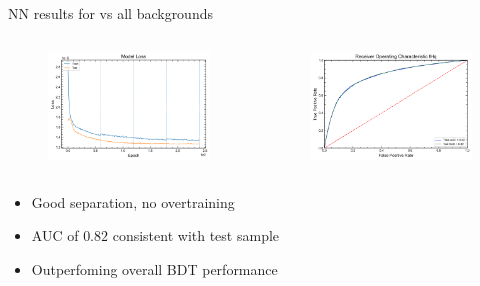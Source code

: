 \begin{frame}{NN results for \tHq vs all backgrounds}
\begin{columns}
  \begin{column}{0.5\textwidth}
    \begin{figure}
      \includegraphics[width=\textwidth]{loss_lephad.png}
    \end{figure}
  \end{column}
  \begin{column}{0.5\textwidth}
    \begin{figure}
      \includegraphics[width=\textwidth]{ROC_lephad.png}
    \end{figure}
  \end{column}
\end{columns}
\begin{itemize}
  \item Good separation, no overtraining
  \item AUC of $0.82$ consistent with test sample
  \item Outperfoming overall BDT performance
\end{itemize}
\end{frame}

